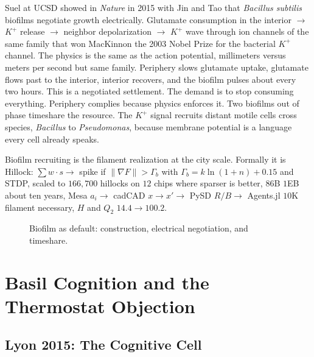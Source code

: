 \documentclass[11pt,a4paper]{article}
\begin{document}
Suel at UCSD showed in \textit{Nature} in 2015 with Jin and Tao that \textit{Bacillus subtilis} biofilms negotiate growth electrically. Glutamate consumption in the interior $\to$ $K^+$ release $\to$ neighbor depolarization $\to$ $K^+$ wave through ion channels of the same family that won MacKinnon the 2003 Nobel Prize for the bacterial $K^+$ channel. The physics is the same as the action potential, millimeters versus meters per second but same family. Periphery slows glutamate uptake, glutamate flows past to the interior, interior recovers, and the biofilm pulses about every two hours. This is a negotiated settlement. The demand is to stop consuming everything. Periphery complies because physics enforces it. Two biofilms out of phase timeshare the resource. The $K^+$ signal recruits distant motile cells cross species, \textit{Bacillus} to \textit{Pseudomonas}, because membrane potential is a language every cell already speaks.

Biofilm recruiting is the filament realization at the city scale. Formally it is Hillock: $\sum w \cdot s \to$ spike if $\|\nabla F\| > \Gamma_b$ with $\Gamma_b = k \ln(1+n) + 0.15$ and STDP, scaled to $166{,}700$ hillocks on $12$ chips where sparser is better, $86$B $1$EB about ten years, Mesa $a_i \to$ cadCAD $x \to x' \to$ PySD $R/B \to$ Agents.jl $10$K filament necessary, $H$ and $Q_2$ $14.4 \to 100.2$.

\begin{figure}[h]
\centering
{}
\caption{Biofilm as default: construction, electrical negotiation, and timeshare.}
\label{fig:biofilm}
\end{figure}

\section{Basil Cognition and the Thermostat Objection}
\label{sec:basil}

\subsection{Lyon 2015: The Cognitive Cell}
\end{document}
